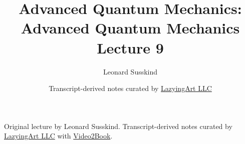 \documentclass[11pt,oneside]{book}
\begin{document}
\frontmatter
\title{Advanced Quantum Mechanics: Advanced Quantum Mechanics Lecture 9}
\author{Leonard Susskind}
\date{Transcript-derived notes curated by \href{https://lazying.art}{LazyingArt LLC}}
\maketitle
\begin{center}
\small Original lecture by Leonard Susskind. Transcript-derived notes curated by \href{https://lazying.art}{LazyingArt LLC} with \href{https://github.com/lachlanchen/Video2Book}{Video2Book}.
\end{center}
\clearpage
\mainmatter

\end{document}
